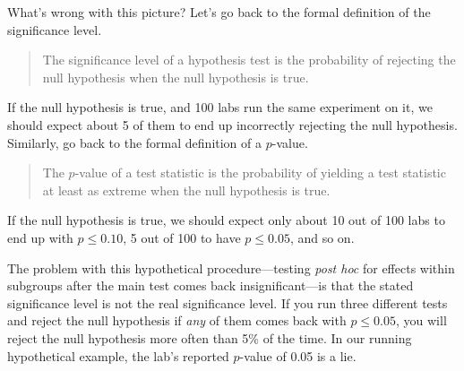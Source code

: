 \documentclass[12pt,oneside,openany]{book}
\begin{document}
What's wrong with this picture? Let's go back to the formal definition
of the significance level.

\begin{quote}
The significance level of a hypothesis test is the probability of
rejecting the null hypothesis when the null hypothesis is true.
\end{quote}

If the null hypothesis is true, and 100 labs run the same experiment on
it, we should expect about 5 of them to end up incorrectly rejecting the
null hypothesis. Similarly, go back to the formal definition of a
\(p\)-value.

\begin{quote}
The \(p\)-value of a test statistic is the probability of yielding a
test statistic at least as extreme when the null hypothesis is true.
\end{quote}

If the null hypothesis is true, we should expect only about 10 out of
100 labs to end up with \(p \leq 0.10\), 5 out of 100 to have
\(p \leq 0.05\), and so on.

The problem with this hypothetical procedure---testing \emph{post hoc}
for effects within subgroups after the main test comes back
insignificant---is that the stated significance level is not the real
significance level. If you run three different tests and reject the null
hypothesis if \emph{any} of them comes back with \(p \leq 0.05\), you
will reject the null hypothesis more often than 5\% of the time. In our
running hypothetical example, the lab's reported \(p\)-value of 0.05 is
a lie.
\end{document}
